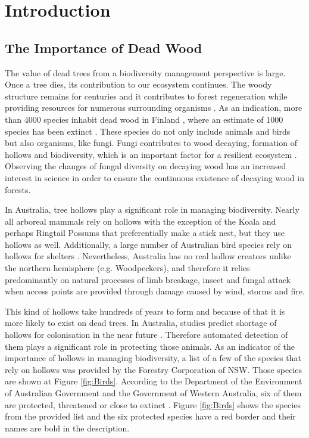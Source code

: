 \documentclass{subfiles}
\begin{document}
\section{Introduction}


\subsection{The Importance of Dead Wood}

\par The value of dead trees from a biodiversity management perspective is large. Once a tree dies, its contribution to our ecosystem continues. The woody structure remains for centuries and it contributes to forest regeneration while providing resources for numerous surrounding organisms \cite{Franklin1987}. As an indication, more than 4000 species inhabit dead wood in Finland \cite{Siitonen2001}, where an estimate of 1000 species has been extinct \cite{Hanski2000}. These species do not only include animals and birds but also organisms, like fungi. Fungi contributes to wood decaying, formation of hollows and biodiversity, which is an important factor for a resilient ecosystem \cite{Peterson2000}. Observing the changes of fungal diversity on decaying wood has an increased interest in science  \cite{Abrego2011} \cite{Stokland2011} \cite{Lonsdale2008} in order to ensure the continuous existence of decaying wood in forests. 




\par In Australia, tree hollows play a significant role in managing biodiversity. Nearly all arboreal mammals rely on hollows with the exception of the Koala and perhaps Ringtail Possums that preferentially make a stick nest, but they use hollows as well. Additionally, a large number of Australian bird species rely on hollows for shelters \cite{Gibbons2002}. Nevertheless, Australia has no real hollow creators unlike the northern hemisphere (e.g. Woodpeckers), and therefore it relies predominantly on natural processes of limb breakage, insect and fungal attack when access points are provided through damage caused by wind, storms and fire. 

\par This kind of hollows take hundreds of years to form and because of that it is more likely to exist on dead trees. In Australia, studies predict shortage of hollows for colonisation in the near future \cite{Lindenmayer2010} \cite{Goldingay2009}. Therefore automated detection of them plays a significant role in protecting those animals. As an indicator of the importance of hollows in managing biodiversity, a list of a few of the species that rely on hollows was provided by the Forestry Corporation of NSW. Those species are shown at Figure \ref{fig:Birds}. According to the Department of the Environment of Australian Government and the Government of Western Australia, six of them are  protected, threatened or close to extinct \cite{AustraliaExtinct1999}  \cite{AustraliaExtince2015}. Figure \ref{fig:Birds} shows the species from the provided list and the six protected species have a red border and their names are bold in the description. 
\end{document}
